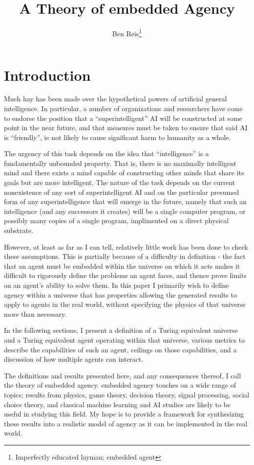 \documentclass[12pt]{article}
\theoremstyle{definition}
\begin{document}
\title{A Theory of embedded Agency}
\author{Ben Reis\footnote{Imperfectly educated layman; embedded agent}}
\maketitle

\section{Introduction}
Much hay has been made over the hypothetical powers of artificial general
intelligence. In particular, a number of organizations and researchers have come
to endorse the position that a ``superintelligent'' AI will be constructed at
some point in the near future, and that measures must be taken to ensure that
said AI is ``friendly'', ie not likely to cause significant harm to humanity as
a whole.

The urgency of this task depends on the idea that ``intelligence'' is a
fundamentally unbounded property. That is, there is no maximally intelligent
mind and there exists a mind capable of constructing other minds that share its
goals but are more intelligent. The nature of the task depends on the current
nonexistence of any sort of superintelligent AI and on the particular presumed
form of any superintelligence that will emerge in the future, namely that such
an intelligence (and any successors it creates) will be a single computer
program, or possibly many copies of a single program, implimented on a direct
physical substrate.

However, at least as far as I can tell, relatively little work has been done to
check these assumptions. This is partially because of a difficulty in definition
- the fact that an agent must be embedded within the universe on which it acts
makes it difficult to rigorously define the problems an agent faces, and thence
prove limits on an agent's ability to solve them. In this paper I primarily wish
to define agency within a universe that has properties allowing the generated
results to apply to agents in the real world, without specifying the physics of
that universe more than necessary.

In the following sections, I present a definition of a Turing equivalent
universe and a Turing equivalent agent operating within that universe, various
metrics to describe the capabilities of such an agent, ceilings on those
capabilities, and a discussion of how multiple agents can interact.

The definitions and results presented here, and any consequences thereof, I call
the theory of embedded agency. embedded agency touches on a wide range of
topics; results from physics, game theory, decision theory, signal processing,
social choice theory, and classical machine learning and AI studies are likely
to be useful in studying this field. My hope is to provide a framework for
synthesizing these results into a realistic model of agency as it can be
implemented in the real world.
\end{document}
